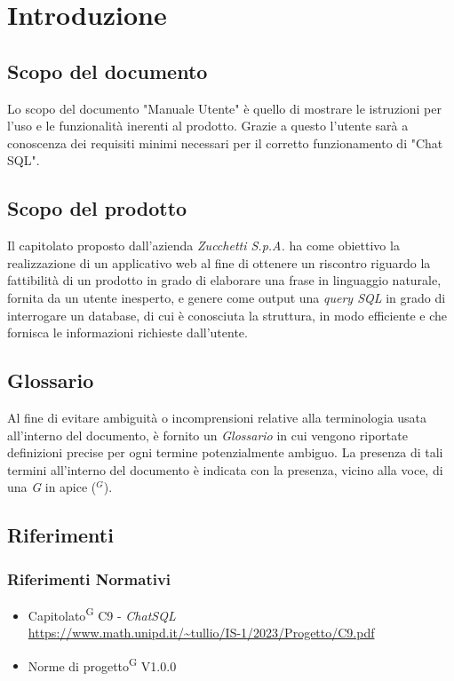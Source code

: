 \documentclass[5pt]{article}
\begin{document}
	
	
	\pagebreak
	\tableofcontents
	\pagebreak
	
	
	
	\section{Introduzione}
		\subsection{Scopo del documento}
			Lo scopo del documento "Manuale Utente" è quello di mostrare le istruzioni per l'uso e le funzionalità inerenti al prodotto. Grazie a questo l'utente sarà a conoscenza dei requisiti minimi necessari per il corretto funzionamento di "Chat SQL".

		\subsection{Scopo del prodotto}
			Il capitolato proposto dall'azienda \textit{Zucchetti S.p.A.} ha come obiettivo la realizzazione di un applicativo web al fine di ottenere un riscontro riguardo la fattibilità di un prodotto in grado di elaborare una frase in linguaggio naturale, fornita da un utente inesperto, e genere come output una \textit{query SQL} in grado di interrogare un database, di cui è conosciuta la struttura, in modo efficiente e che fornisca le informazioni richieste dall'utente.

        \subsection{Glossario}
     		Al fine di evitare ambiguità o incomprensioni relative alla terminologia usata all'interno del documento, è fornito un \textit{Glossario} in cui vengono riportate definizioni precise per ogni termine potenzialmente ambiguo. La presenza di tali termini all'interno del documento è indicata con la presenza, vicino alla voce, di una \textit{G} in apice ($^G$). 

        \subsection{Riferimenti}
        
			\subsubsection{Riferimenti Normativi}
			\begin{itemize}
				\item Capitolato\textsuperscript{G} C9 - \textit{ChatSQL} \\ \url{https://www.math.unipd.it/~tullio/IS-1/2023/Progetto/C9.pdf} 
				\item Norme di progetto\textsuperscript{G} V1.0.0
			\end{itemize}
			
\end{document}
